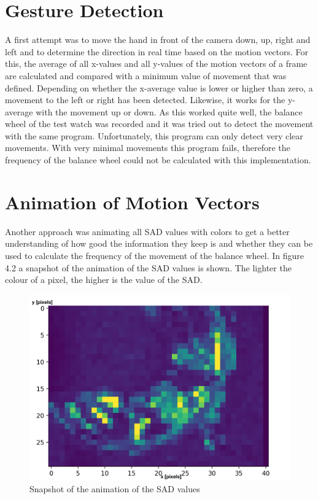 \documentclass[12pt, a4paper]{report}
\begin{document}
    \section{Gesture Detection}
    A first attempt was to move the hand in front of the camera down, up, right and left and to determine the direction in real time based on the motion vectors. 
    \newline
    For this, the average of all x-values and all y-values of the motion vectors of a frame are calculated and compared with a minimum value of movement that was defined. Depending on whether the x-average value is lower or higher than zero, a movement to the left or right has been detected. Likewise, it works for the y-average with the movement up or down.
        \newline
 As this worked quite well, the balance wheel of the test watch was recorded and it was tried out to detect the movement with the same program. Unfortunately, this program can only detect very clear movements. With very minimal movements this program fails, therefore the frequency of the balance wheel could not be calculated with this implementation. 
    
    \section{Animation of Motion Vectors}
    
   Another approach was animating all SAD values with colors to get a better understanding of how good the information they keep is and whether they can be used to calculate the frequency of the movement of the balance wheel. In figure 4.2 a snapshot of the animation of the SAD values is shown. The lighter the colour of a pixel, the higher is the value of the SAD. 
    
    \noindent
    \begin{figure}[H]
    \centering
    \includegraphics[scale=0.6]{Images/animation_sad.png}
    
    \caption{Snapshot of the animation of the SAD values}
    \end{figure}
     
\end{document}
